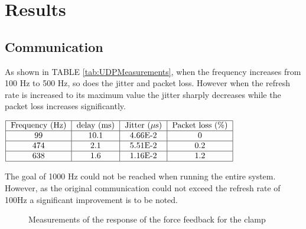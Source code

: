\section{Results}

\subsection{Communication}

As shown in TABLE \ref{tab:UDPMeasurements}, when the frequency increases from 100 Hz to 500 Hz, so does the jitter and packet loss. However when the refresh rate is increased to its maximum value the jitter sharply decreases while the packet loss increases significantly.

\begin{center}
  $\begin{tabular}{|c|c|c|c|c|c|}
    \hline
    \text{Frequency (Hz)} & \text{delay (ms)} & \text{Jitter ($\mu$s)} & \text{Packet loss (\%)}\\
    \hline
    99 & 10.1 & 4.66E-2 & 0 \\
    \hline
    474 & 2.1 & 5.51E-2 & 0.2 \\
    \hline
    638 & 1.6 & 1.16E-2 & 1.2 \\
    \hline
  \end{tabular}$
  \label{tab:UDPMeasurements}
\end{center}
The goal of 1000 Hz could not be reached when running the entire system. However, as the original communication could not exceed the refresh rate of 100Hz a significant improvement is to be noted.

\begin{figure}[h]\label{fbkm}
  
  \caption{Measurements of the response of the force feedback for the clamp}
\end{figure}


